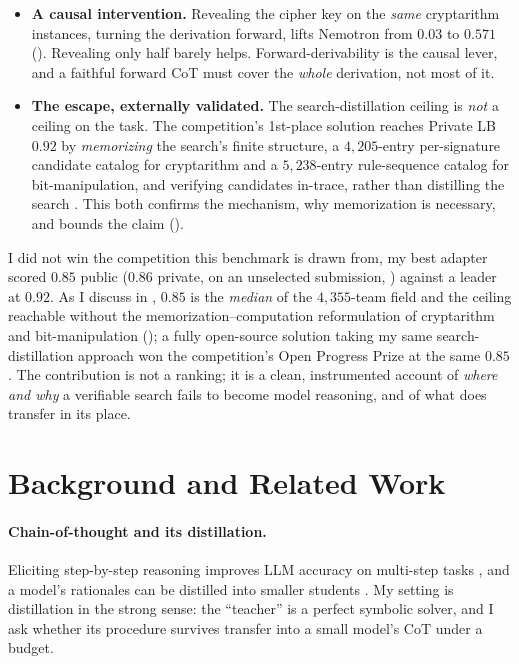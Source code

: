\documentclass[11pt]{article}
\begin{document}
\begin{itemize}[leftmargin=1.4em,itemsep=2pt,topsep=2pt]
\item \textbf{A causal intervention.} Revealing the cipher key on the \emph{same} cryptarithm
  instances, turning the derivation forward, lifts Nemotron from $0.03$ to $\mathbf{0.571}$
  (). Revealing only half barely helps. Forward-derivability is the causal
  lever, and a faithful forward CoT must cover the \emph{whole} derivation, not most of it.
\item \textbf{The escape, externally validated.} The search-distillation ceiling is \emph{not} a
  ceiling on the task. The competition's 1st-place solution reaches Private LB $0.92$ by
  \emph{memorizing} the search's finite structure, a $4{,}205$-entry per-signature candidate
  catalog for cryptarithm and a $5{,}238$-entry rule-sequence catalog for bit-manipulation, and
  verifying candidates in-trace, rather than distilling the search \citep{goodmeatday2026first}.
  This both confirms the mechanism, why memorization is necessary, and bounds the claim
  ().
\end{itemize}

I did not win the competition this benchmark is drawn from, my best adapter scored
$0.85$ public ($0.86$ private, on an unselected submission, ) against a
leader at $0.92$. As I discuss in , $0.85$ is the
\emph{median} of the $4{,}355$-team field and the ceiling reachable without the
memorization--computation reformulation of cryptarithm and bit-manipulation ();
a fully open-source solution taking my same search-distillation approach won the competition's
Open Progress Prize at the same $0.85$. The contribution is not a ranking; it is
a clean, instrumented account of \emph{where and why} a verifiable search fails to become
model reasoning, and of what does transfer in its place.

\section{Background and Related Work}
\label{sec:related}

\paragraph{Chain-of-thought and its distillation.} Eliciting step-by-step reasoning
improves LLM accuracy on multi-step tasks \citep{wei2022cot, wang2023selfconsistency}, and
a model's rationales can be distilled into smaller students
\citep{hinton2015distill, hsieh2023distill, muennighoff2025s1}. My setting is distillation
in the strong sense: the ``teacher'' is a perfect symbolic solver, and I ask whether its
procedure survives transfer into a small model's CoT under a budget.
\end{document}
